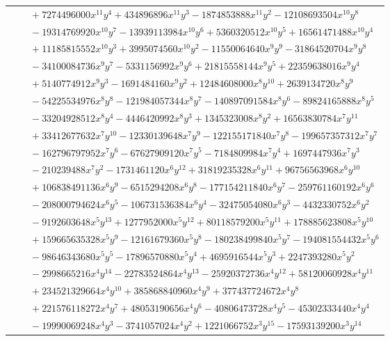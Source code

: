 \documentclass[11pt]{article}
\begin{document}
\begin{longtable}{@{}ll@{}}
 & $\quad +7274496000x^{11}y^{4}+434896896x^{11}y^{3}-1874853888x^{11}y^{2}-12108693504x^{10}y^{8}$\\
 & $\quad -19314769920x^{10}y^{7}-13939113984x^{10}y^{6}+5360320512x^{10}y^{5}+16561471488x^{10}y^{4}$\\
 & $\quad +11185815552x^{10}y^{3}+3995074560x^{10}y^{2}-11550064640x^{9}y^{9}-31864520704x^{9}y^{8}$\\
 & $\quad -34100084736x^{9}y^{7}-5331156992x^{9}y^{6}+21815558144x^{9}y^{5}+22359638016x^{9}y^{4}$\\
 & $\quad +5140774912x^{9}y^{3}-1691484160x^{9}y^{2}+12484608000x^{8}y^{10}+2639134720x^{8}y^{9}$\\
 & $\quad -54225534976x^{8}y^{8}-121984057344x^{8}y^{7}-140897091584x^{8}y^{6}-89824165888x^{8}y^{5}$\\
 & $\quad -33204928512x^{8}y^{4}-4446420992x^{8}y^{3}+1345323008x^{8}y^{2}+16563830784x^{7}y^{11}$\\
 & $\quad +33412677632x^{7}y^{10}-12330139648x^{7}y^{9}-122155171840x^{7}y^{8}-199657357312x^{7}y^{7}$\\
 & $\quad -162796797952x^{7}y^{6}-67627909120x^{7}y^{5}-7184809984x^{7}y^{4}+1697447936x^{7}y^{3}$\\
 & $\quad -210239488x^{7}y^{2}-1731461120x^{6}y^{12}+31819235328x^{6}y^{11}+96756563968x^{6}y^{10}$\\
 & $\quad +106838491136x^{6}y^{9}-6515294208x^{6}y^{8}-177154211840x^{6}y^{7}-259761160192x^{6}y^{6}$\\
 & $\quad -208000794624x^{6}y^{5}-106731536384x^{6}y^{4}-32475054080x^{6}y^{3}-4432330752x^{6}y^{2}$\\
 & $\quad -9192603648x^{5}y^{13}+1277952000x^{5}y^{12}+80118579200x^{5}y^{11}+178885623808x^{5}y^{10}$\\
 & $\quad +159665635328x^{5}y^{9}-12161679360x^{5}y^{8}-180238499840x^{5}y^{7}-194081554432x^{5}y^{6}$\\
 & $\quad -98646343680x^{5}y^{5}-17896570880x^{5}y^{4}+4695916544x^{5}y^{3}+2247393280x^{5}y^{2}$\\
 & $\quad -2998665216x^{4}y^{14}-22783524864x^{4}y^{13}-25920372736x^{4}y^{12}+58120060928x^{4}y^{11}$\\
 & $\quad +234521329664x^{4}y^{10}+385868840960x^{4}y^{9}+377437724672x^{4}y^{8}$\\
 & $\quad +221576118272x^{4}y^{7}+48053190656x^{4}y^{6}-40806473728x^{4}y^{5}-45302333440x^{4}y^{4}$\\
 & $\quad -19990069248x^{4}y^{3}-3741057024x^{4}y^{2}+1221066752x^{3}y^{15}-17593139200x^{3}y^{14}$\\

\end{longtable}
\end{document}
